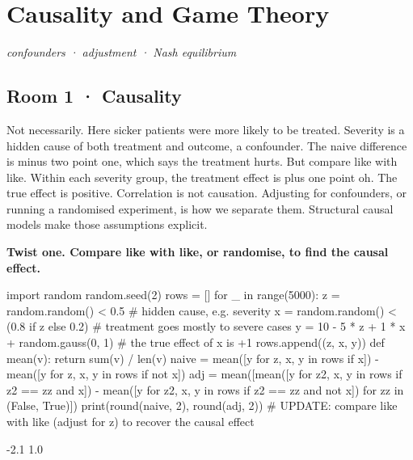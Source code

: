 \documentclass[11pt,a4paper]{report}
\begin{document}
\chapter{Causality and Game Theory}
\textit{confounders · adjustment · Nash equilibrium}
\section*{Room 1 · Causality}
Not necessarily. Here sicker patients were more likely to be treated. Severity is a hidden cause of both treatment and outcome, a confounder. The naive difference is minus two point one, which says the treatment hurts. But compare like with like. Within each severity group, the treatment effect is plus one point oh. The true effect is positive. Correlation is not causation. Adjusting for confounders, or running a randomised experiment, is how we separate them. Structural causal models make those assumptions explicit.
\begin{tcolorbox}[colback=yellow!12,colframe=orange!70!black,boxrule=0.4pt,left=4pt,right=4pt,top=2pt,bottom=2pt]\textbf{Twist one. Compare like with like, or randomise, to find the causal effect.}\end{tcolorbox}
\begin{Code}
import random
random.seed(2)
rows = []
for _ in range(5000):
    z = random.random() < 0.5                   # hidden cause, e.g. severity
    x = random.random() < (0.8 if z else 0.2)   # treatment goes mostly to severe cases
    y = 10 - 5 * z + 1 * x + random.gauss(0, 1) # the true effect of x is +1
    rows.append((z, x, y))
def mean(v): return sum(v) / len(v)
naive = mean([y for z, x, y in rows if x]) - mean([y for z, x, y in rows if not x])
adj = mean([mean([y for z2, x, y in rows if z2 == zz and x]) -
            mean([y for z2, x, y in rows if z2 == zz and not x]) for zz in (False, True)])
print(round(naive, 2), round(adj, 2))
# UPDATE: compare like with like (adjust for z) to recover the causal effect
\end{Code}
\begin{Out}
-2.1 1.0
\end{Out}
\end{document}
